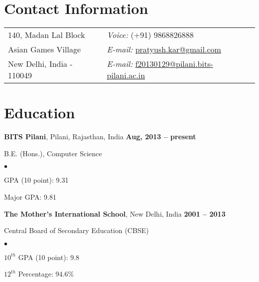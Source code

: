 \documentclass[margin,line]{res}
\newenvironment{list1}{
  \begin{list}{\ding{113}}{%
      \setlength{\itemsep}{0in}
      \setlength{\parsep}{0in} \setlength{\parskip}{0in}
      \setlength{\topsep}{0in} \setlength{\partopsep}{0in} 
      \setlength{\leftmargin}{0.17in}}}{\end{list}}
\newenvironment{list2}{
  \begin{list}{$\bullet$}{%
      \setlength{\itemsep}{0in}
      \setlength{\parsep}{0in} \setlength{\parskip}{0in}
      \setlength{\topsep}{0in} \setlength{\partopsep}{0in} 
      \setlength{\leftmargin}{0.2in}}}{\end{list}}
\begin{document}

\begin{resume}
\section{\sc Contact Information}
\vspace{.05in}
\begin{tabular}{@{}p{2in}p{4in}}
140, Madan Lal Block        & {\it Voice:} (+91) 9868826888 \\            
Asian Games Village         & {\it E-mail:} \href{mailto:pratyush.kar@gmail.com}{pratyush.kar@gmail.com} \\         
New Delhi, India - 110049   & {\it E-mail:} \href{mailto:f20130129@pilani.bits-pilani.ac.in}{f20130129@pilani.bits-pilani.ac.in} \\    
\end{tabular}



\section{\sc Education}
{\bf BITS Pilani}, Pilani, Rajasthan, India \hfill {\bf Aug, 2013 -- present}\\
\vspace*{-.1in}
\begin{list1}
\item[] B.E. (Hons.), Computer Science
\begin{list2}
\vspace*{.05in}
\item GPA (10 point): 9.31
\item Major GPA: 9.81
\end{list2}
\vspace*{.05in}
\end{list1}

{\bf The Mother's International School}, New Delhi, India \hfill {\bf 2001 -- 2013}\\
\vspace*{-.1in}
\begin{list1}
\item[] Central Board of Secondary Education (CBSE)
\begin{list2}
\vspace*{.05in}
\item $10^{th}$ GPA (10 point): 9.8
\item $12^{th}$ Percentage: 94.6\%
\end{list2}
\vspace*{.05in}
\end{list1}



\end{resume}
\end{document}
